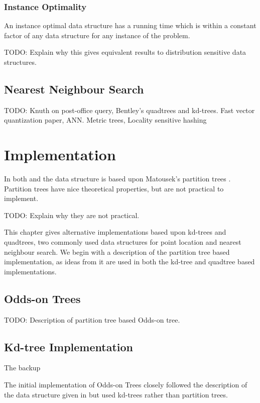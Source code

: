\documentclass[mcs]{scsthesis}
\begin{document}
\subsection{Instance Optimality}

An instance optimal data structure \cite{chan} has a running time which is
within a constant factor of any data structure for any instance of the problem.

TODO: Explain why this gives equivalent results to distribution sensitive data
structures.

\section{Nearest Neighbour Search}

TODO: Knuth on post-office query, Bentley's quadtrees and kd-trees.  Fast
vector quantization paper, ANN.  Metric trees, Locality sensitive hashing

\chapter{Implementation}


In both \cite{oddson} and \cite{chan} the data structure is based upon
Matousek's partition trees \cite{matousek}.  Partition trees have nice
theoretical properties, but are not practical to implement.

TODO: Explain why they are not practical.

This chapter gives alternative implementations based upon kd-trees and
quadtrees, two commonly used data structures for point location and nearest
neighbour search.  We begin with a description of the partition tree based
implementation, as ideas from it are used in both the kd-tree and quadtree
based implementations.

\section{Odds-on Trees}

TODO: Description of partition tree based Odds-on tree.


\section{Kd-tree Implementation}

The backup

The initial implementation of Odds-on Trees closely followed the description of
the data structure given in \cite{oddson} but used kd-trees rather than
partition trees.
\end{document}
